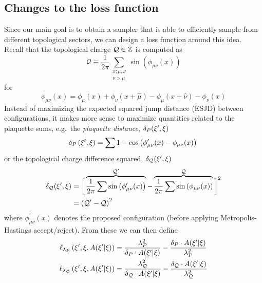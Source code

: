 \subsection{Changes to the loss function}%
\label{subsec:changes_to_loss_fn}
%
Since our main goal is to obtain a sampler that is able to efficiently sample
from different topological sectors, we can design a loss function around this
idea.
%
Recall that the topological charge \({\mathcal{Q}} \in \mathbb{Z}\) is computed as
%
\begin{equation}
  \mathcal{Q} \equiv \frac{1}{2\pi}\sum_{\substack{{x; \mu, \nu}\\{\nu > \mu}}}
    \sin\left(\phi_{\mu\nu}(x)\right)
\end{equation}
%
for
%
\begin{equation}
  \phi_{\mu\nu}(x) = \phi_{\mu}(x) + \phi_{\nu}(x+\hat{\mu}) -
  \phi_{\mu}(x+\hat{\nu}) - \phi_{\nu}(x)
\end{equation}
%
Instead of maximizing the expected squared jump distance (ESJD) between
configurations, it makes more sense to maximize quantities related to the
plaquette sums, e.g.\ the \emph{plaquette distance}, \(\delta_{P}({\xi^{\prime}}, \xi)\)
%
\begin{equation}
  \delta_{P}\left({\xi^{\prime}}, \xi\right)
  = \sum 1 - \cos\left(\phi^{\prime}_{\mu\nu}(x) - \phi_{\mu\nu}(x)\right) \\
  \label{eq:plaq_diff}
\end{equation}
or the topological charge difference squared, \(\delta_{{\mathcal{Q}}}({\xi^{\prime}}, \xi)\)
%
\begin{align}
  \delta_{{\mathcal{Q}}}({\xi^{\prime}}, \xi)
  &= \bigg[\overbrace{\frac{1}{2\pi}\sum
    \sin\left(\phi^{\prime}_{\mu\nu}(x)\right)}^{{\mathcal{Q}}^{\prime}}
  - \overbrace{\frac{1}{2\pi}\sum
    \sin\left(\phi_{\mu\nu}(x)\right)}^{{\mathcal{Q}}}\bigg]^{2} \\
  &= {({\mathcal{Q}}^{\prime} - {\mathcal{Q}})}^2
  \label{eq:charge_diff}
\end{align}
%
where \(\phi_{\mu\nu}^{\prime}(x)\) denotes the proposed configuration (before
applying Metropolis-Hastings accept/reject).
%
From these we can then define
%
\begin{align}
  \ell_{\lambda_{P}}\left({\xi^{\prime}}, \xi, A({\xi^{\prime}}|\xi)\right) 
  &= \frac{\lambda_{P}^{2}}{\delta_{P}\cdot A(\xi^{\prime}|\xi)}
    -  \frac{\delta_{P}\cdot A(\xi^{\prime}|\xi)}{\lambda_{P}^{2}} \\
  \ell_{\lambda_{{\mathcal{Q}}}}\left({\xi^{\prime}}, \xi, A({\xi^{\prime}}|\xi)\right) 
  &= \frac{\lambda_{{\mathcal{Q}}}^{2}}{\delta_{{\mathcal{Q}}}\cdot A(\xi^{\prime}|\xi)}
    -  \frac{\delta_{{\mathcal{Q}}}\cdot A(\xi^{\prime}|\xi)}{\lambda_{{\mathcal{Q}}}^{2}}
\label{eq:ell_lambda}
\end{align}
